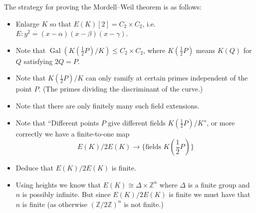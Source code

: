 \documentclass[a4paper]{article}
\theoremstyle{plain}
\theoremstyle{remark}
\theoremstyle{definition}
\DeclareMathOperator{\Gal}{Gal}
\newcommand{\Z}{\mathbb{Z}}
\begin{document}
The strategy for proving the Mordell--Weil theorem is as follows:
\begin{itemize}
    \item Enlarge $K$ so that $E(K)[2]=C_2\times C_2$, i.e.
        $E:y^2=(x-\alpha)(x-\beta)(x-\gamma)$.

    \item Note that $\Gal(K(\frac{1}{2}P)/K)\le C_2\times C_2$, where
        $K(\frac{1}{2}P)$ means $K(Q)$ for $Q$ satisfying $2Q=P$.

    \item Note that $K(\frac{1}{2}P)/K$ can only ramify at certain primes
        independent of the point $P$. (The primes dividing the discriminant of
        the curve.)

    \item Note that there are only finitely many such field extensions.

    \item Note that ``Different points $P$ give different fields
        $K(\frac{1}{2}P)/K$'', or more correctly we have a finite-to-one map
        \begin{equation*}
            E(K)/2E(K) \to \{\text{fields $K(\textstyle\frac{1}{2}P)$}\}
        \end{equation*}

    \item Deduce that $E(K)/2E(K)$ is finite.

    \item Using heights we know that $E(K)\cong\Delta\times\Z^n$ where $\Delta$
        is a finite group and $n$ is possibly infinite. But since $E(K)/2E(K)$
        is finite we must have that $n$ is finite (as otherwise $(\Z/2\Z)^n$ is
        not finite.)
\end{itemize}
\end{document}
